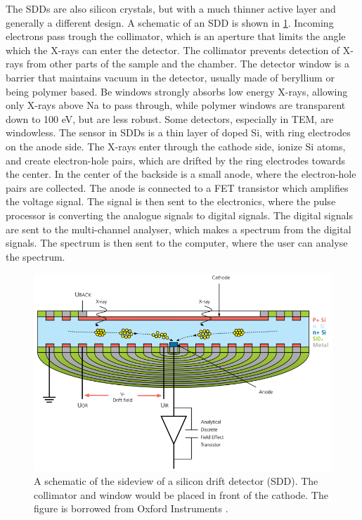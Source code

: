 The SDDs are also silicon crystals, but with a much thinner active layer and generally a different design.
A schematic of an SDD is shown in \cref{fig:eds_sdd}.
Incoming electrons pass trough the collimator, which is an aperture that limits the angle which the X-rays can enter the detector.
The collimator prevents detection of X-rays from other parts of the sample and the chamber.
The detector window is a barrier that maintains vacuum in the detector, usually made of beryllium or being polymer based.
Be windows strongly absorbs low energy X-rays, allowing only X-rays above Na to pass through, while polymer windows are transparent down to 100 eV, but are less robust.
Some detectors, especially in TEM, are windowless.
The sensor in SDDs is a thin layer of doped Si, with ring electrodes on the anode side.
The X-rays enter through the cathode side, ionize Si atoms, and create electron-hole pairs, which are drifted by the ring electrodes towards the center.
In the center of the backside is a small anode, where the electron-hole pairs are collected.
The anode is connected to a FET transistor which amplifies the voltage signal.
The signal is then sent to the electronics, where the pulse processor is converting the analogue signals to digital signals.
The digital signals are sent to the multi-channel analyser, which makes a spectrum from the digital signals.
The spectrum is then sent to the computer, where the user can analyse the spectrum.


\begin{figure}[pht]
    \centering
    \includegraphics[width=0.8\linewidth]{figures/EDS_SDD.png}
    \caption{
        A schematic of the sideview of a silicon drift detector (SDD).
        The collimator and window would be placed in front of the cathode.
        The figure is borrowed from Oxford Instruments \cite{oxford_sdd_explained}.
    }
    \label{fig:eds_sdd}
\end{figure}



